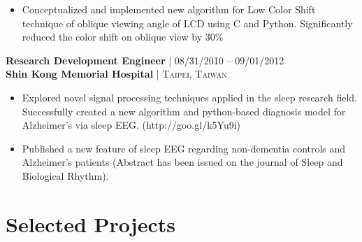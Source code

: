 \documentclass[10pt]{article} %
\begin{document}
{\begin{minipage}[t]{0.47\textwidth}
\begin{itemize}[leftmargin=*, topsep=2pt, partopsep=2.5pt]
\setlength\itemsep{1pt}

\item Conceptualized and implemented new algorithm for Low Color Shift technique of oblique viewing angle of LCD using C and Python. Significantly reduced the color shift on oblique view by 30\%

\end{itemize}


{\raggedright\normalsize
\textbf{Research Development Engineer} {\hfill\footnotesize\textsc{| 08/31/2010 -- 09/01/2012}} \\ 
\textbf{Shin Kong Memorial Hospital} {\hfill\footnotesize\textsc{| Taipei, Taiwan}}}

\begin{itemize}[leftmargin=*, topsep=2pt, partopsep=2.5pt]
\setlength\itemsep{1pt}

\item Explored novel signal processing techniques applied in the sleep research field. Successfully created a new algorithm and python-based diagnosis model for Alzheimer’s via sleep EEG. (http://goo.gl/k5Yu9i)

\item Published a new feature of sleep EEG regarding non-dementia controls and Alzheimer’s patients (Abstract has been issued on the journal of Sleep and Biological Rhythm).

\end{itemize}


\section{Selected Projects} 









\end{minipage}}
\end{document}
